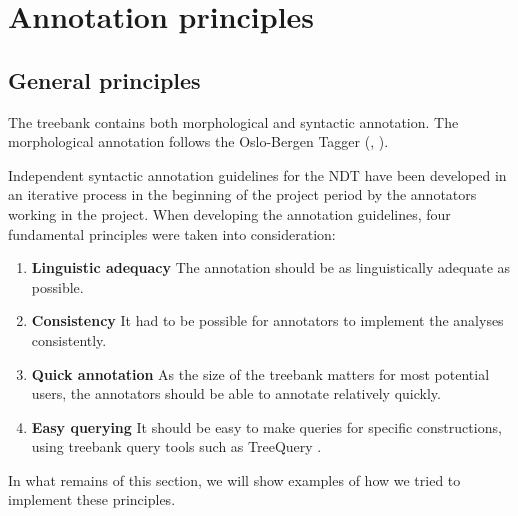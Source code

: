 \documentclass[11pt,a4paper]{article}
\begin{document}

\section{Annotation principles}
\subsection{General principles}


The treebank contains both morphological and syntactic annotation. The morphological annotation follows the Oslo-Bergen Tagger (\cite{Hag:Joh:Nok:00}, \cite<see also>{Sol:2013}).

Independent syntactic annotation guidelines for the NDT have been developed in an iterative process in the beginning of the project period by the annotators working in the project\cite{Kin:Sol:Eri:2013}. When developing the annotation guidelines, four fundamental principles were taken into consideration:
\begin{enumerate}
 \item \textbf{Linguistic adequacy} The annotation should be as linguistically adequate as possible.
 \item \textbf{Consistency} It had to be possible for annotators to implement the analyses consistently.
 \item \textbf{Quick annotation} As the size of the treebank matters for most potential users, the annotators should be able to annotate relatively quickly.
 \item \textbf{Easy querying} It should be easy to make queries for specific constructions, using treebank query tools such as TreeQuery \cite{Paj:Ste:09}.
\end{enumerate}
In what remains of this section, we will show examples of how we tried to implement these principles.
\end{document}
